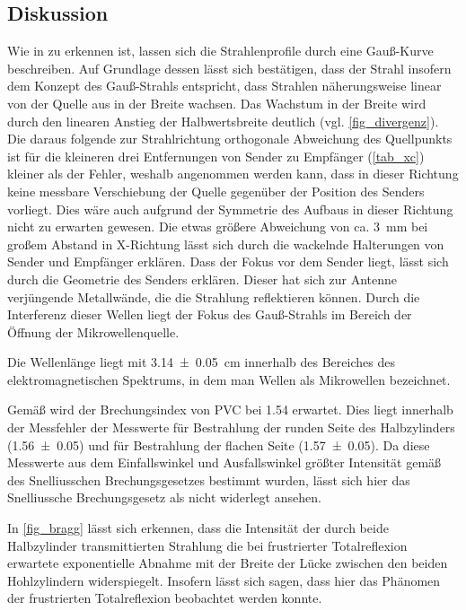 \documentclass[
	a4paper,
	12pt,
	pagesize,
	ngerman
]{scrartcl}
\begin{document}
	\subsection{Diskussion}
	
	Wie in  zu erkennen ist, lassen sich die Strahlenprofile durch eine Gauß-Kurve beschreiben.
	Auf Grundlage dessen lässt sich bestätigen, dass der Strahl insofern dem Konzept des Gauß-Strahls entspricht, dass Strahlen näherungsweise linear von der Quelle aus in der Breite wachsen.
	Das Wachstum in der Breite wird durch den linearen Anstieg der Halbwertsbreite deutlich (vgl. \cref{fig_divergenz}).
	Die daraus folgende zur Strahlrichtung orthogonale Abweichung des Quellpunkts ist für die kleineren drei Entfernungen von Sender zu Empfänger (\cref{tab_xc}) kleiner als der Fehler, weshalb angenommen werden kann, dass in dieser Richtung keine messbare Verschiebung der Quelle gegenüber der Position des Senders vorliegt.
	Dies wäre auch aufgrund der Symmetrie des Aufbaus in dieser Richtung nicht zu erwarten gewesen.
	Die etwas größere Abweichung von ca. \SI{3}{mm} bei großem Abstand in X-Richtung lässt sich durch die wackelnde Halterungen von Sender und Empfänger erklären.
	Dass der Fokus vor dem Sender liegt, lässt sich durch die Geometrie des Senders erklären.
	Dieser hat sich zur Antenne verjüngende Metallwände, die die Strahlung reflektieren können.
	Durch die Interferenz dieser Wellen liegt der Fokus des Gauß-Strahls im Bereich der Öffnung der Mikrowellenquelle.
	
	Die Wellenlänge liegt mit \SI{3,14\pm 0,05}{cm} innerhalb des Bereiches des elektromagnetischen Spektrums, in dem man Wellen als Mikrowellen bezeichnet.
	
	Gemäß \cite{PVC-Brech} wird der Brechungsindex von PVC bei \SI{1,54}{} erwartet.
	Dies liegt innerhalb der Messfehler der Messwerte für Bestrahlung der runden Seite des Halbzylinders (\SI{1,56\pm 0,05}{}) und für Bestrahlung der flachen Seite (\SI{1,57 \pm 0,05}{}).
	Da diese Messwerte aus dem Einfallswinkel und Ausfallswinkel größter Intensität gemäß des Snelliusschen Brechungsgesetzes bestimmt wurden, lässt sich hier das Snelliussche Brechungsgesetz als nicht widerlegt ansehen.
	
	In \cref{fig_bragg} lässt sich erkennen, dass die Intensität der durch beide Halbzylinder transmittierten Strahlung die bei frustrierter Totalreflexion erwartete exponentielle Abnahme mit der Breite der Lücke zwischen den beiden Hohlzylindern widerspiegelt.
	Insofern lässt sich sagen, dass hier das Phänomen der frustrierten Totalreflexion beobachtet werden konnte.
	
\end{document}
